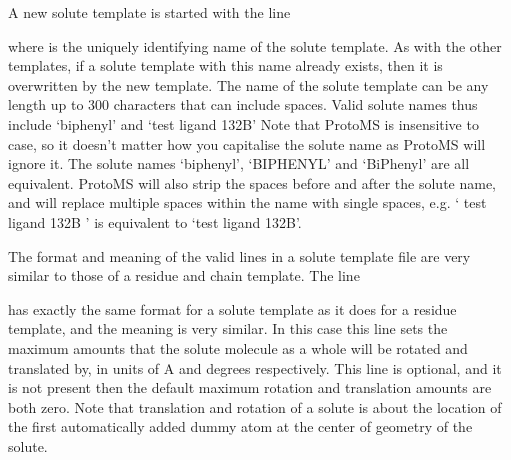 \documentclass[letterpaper,10pt,english]{sphinxmanual}
\begin{document}
A new solute template is started with the line

%
\begin{sphinxVerbatim}[commandchars=\\\{\}]
 
\end{sphinxVerbatim}

where  is the uniquely identifying name of the solute template. As with the other templates, if a solute template with this name already exists, then it is overwritten by the new template. The name of the solute template can be any length up to 300 characters that can include spaces. Valid solute names thus include ‘biphenyl’ and ‘test ligand 132B’ Note that ProtoMS is insensitive to case, so it doesn’t matter how you capitalise the solute name as ProtoMS will ignore it. The solute names ‘biphenyl’, ‘BIPHENYL’ and ‘BiPhenyl’ are all equivalent. ProtoMS will also strip the spaces before and after the solute name, and will replace multiple spaces within the name with single spaces, e.g. ‘ test ligand 132B ’ is equivalent to ‘test ligand 132B’.

The format and meaning of the valid lines in a solute template file are very similar to those of a residue and chain template. The line

%
\begin{sphinxVerbatim}[commandchars=\\\{\}]
    
\end{sphinxVerbatim}

has exactly the same format for a solute template as it does for a residue template, and the meaning is very similar. In this case this line sets the maximum amounts that the solute molecule as a whole will be rotated and translated by, in units of A and degrees respectively. This line is optional, and it is not present then the default maximum rotation and translation amounts are both zero. Note that translation and rotation of a solute is about the location of the first automatically added dummy atom at the center of geometry of the solute.

%
\begin{sphinxVerbatim}[commandchars=\\\{\}]
          
\end{sphinxVerbatim}
\end{document}
